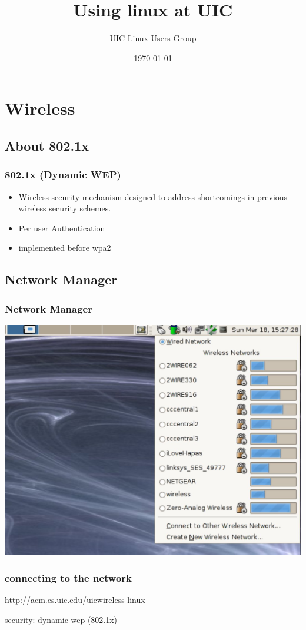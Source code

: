 \documentclass[hyperref={pdfpagelabels=false}]{beamer}
\title{Using linux at UIC}
\author{UIC Linux Users Group}
\date{\today}
\begin{document}
\frame{\titlepage}
\section{Wireless}
\subsection{About 802.1x}
\frame
{
    \frametitle{802.1x (Dynamic WEP)}
    \begin{itemize}
    \item{Wireless security mechanism designed to address shortcomings in previous wireless security schemes.}
    \item{Per user Authentication}
    \item{implemented before wpa2}
    \end{itemize}
}
\subsection{Network Manager}
\frame
{
    \frametitle{Network Manager}
    
    \includegraphics[totalheight=0.7\textheight]{gnm.jpg}

}
\frame
{
    \frametitle{connecting to the network}
    http://acm.cs.uic.edu/uicwireless-linux

    security: dynamic wep (802.1x)
}
\end{document}
